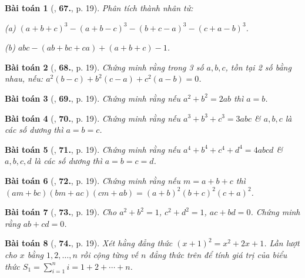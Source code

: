 \documentclass{article}
\numberwithin{equation}{section}
\newtheorem{baitoan}{Bài toán}[section]
\begin{document}
\begin{baitoan}[\cite{Binh_Toan_8_tap_1}, \textbf{67.}, p. 19]
	Phân tích thành nhân tử:
	\begin{enumerate*}
		\item[(a)] $(a + b + c)^3 - (a + b - c)^3 - (b + c - a)^3 - (c + a - b)^3$.
		\item[(b)] $abc - (ab + bc + ca) + (a + b + c) - 1$.
	\end{enumerate*}
\end{baitoan}

\begin{baitoan}[\cite{Binh_Toan_8_tap_1}, \textbf{68.}, p. 19]
	Chứng minh rằng trong 3 số $a,b,c$, tồn tại 2 số bằng nhau, nếu: $a^2(b - c) + b^2(c - a) + c^2(a - b) = 0$.
\end{baitoan}

\begin{baitoan}[\cite{Binh_Toan_8_tap_1}, \textbf{69.}, p. 19]
	Chứng minh rằng nếu $a^2 + b^2 = 2ab$ thì $a = b$.
\end{baitoan}

\begin{baitoan}[\cite{Binh_Toan_8_tap_1}, \textbf{70.}, p. 19]
	Chứng minh rằng nếu $a^3 + b^3 + c^3 = 3abc$ \& $a,b,c$ là các số dương thì $a = b = c$.
\end{baitoan}

\begin{baitoan}[\cite{Binh_Toan_8_tap_1}, \textbf{71.}, p. 19]
	Chứng minh rằng nếu $a^4 + b^4 + c^4 + d^4 = 4abcd$ \& $a,b,c,d$ là các số dương thì $a = b = c = d$.
\end{baitoan}

\begin{baitoan}[\cite{Binh_Toan_8_tap_1}, \textbf{72.}, p. 19]
	Chứng minh rằng nếu $m = a + b + c$ thì $(am + bc)(bm + ac)(cm + ab) = (a + b)^2(b + c)^2(c + a)^2$.
\end{baitoan}

\begin{baitoan}[\cite{Binh_Toan_8_tap_1}, \textbf{73.}, p. 19]
	Cho $a^2 + b^2 = 1$, $c^2 + d^2 = 1$, $ac + bd = 0$. Chứng minh rằng $ab + cd = 0$.
\end{baitoan}

\begin{baitoan}[\cite{Binh_Toan_8_tap_1}, \textbf{74.}, p. 19]
	Xét hằng đẳng thức $(x + 1)^2 = x^2 + 2x + 1$. Lần lượt cho $x$ bằng $1,2,\ldots,n$ rồi cộng từng vế $n$ đẳng thức trên để tính giá trị của biểu thức $S_1 = \sum_{i=1}^n i = 1 + 2 + \cdots + n$.
\end{baitoan}
\end{document}
